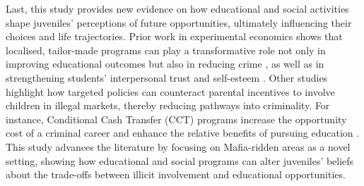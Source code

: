 \documentclass[12pt]{article}
\theoremstyle{plain}
\theoremstyle{plain}
\theoremstyle{plain}
\theoremstyle{definition}
\theoremstyle{plain}
\theoremstyle{definition}
\theoremstyle{plain}
\theoremstyle{remark}
\theoremstyle{definition}
\theoremstyle{definition}
\theoremstyle{plain}
\begin{document}
Last, this study provides new evidence on how educational and social activities shape juveniles’ perceptions of future opportunities, ultimately influencing their choices and life trajectories. Prior work in experimental economics shows that localised, tailor-made programs can play a transformative role not only in improving educational outcomes but also in reducing crime \citep{heller_thinking_2017, garcia_early_2019}, as well as in strengthening students’ interpersonal trust and self-esteem \citep{kenney_countering_2002}. Other studies highlight how targeted policies can counteract parental incentives to involve children in illegal markets, thereby reducing pathways into criminality. For instance, Conditional Cash Transfer (CCT) programs increase the opportunity cost of a criminal career and enhance the relative benefits of pursuing education \citep{sviatschi_making_2022, sviatschi_spreading_2022}. This study advances the literature by focusing on Mafia-ridden areas as a novel setting, showing how educational and social programs can alter juveniles’ beliefs about the trade-offs between illicit involvement and educational opportunities. \par
\medskip
\end{document}
